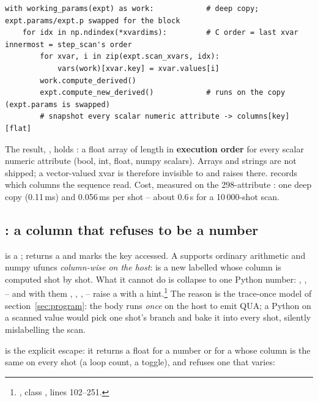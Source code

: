 \begin{lstlisting}[style=py]
with working_params(expt) as work:            # deep copy; expt.params/expt.p swapped for the block
    for idx in np.ndindex(*xvardims):         # C order = last xvar innermost = step_scan's order
        for xvar, i in zip(expt.scan_xvars, idx):
            vars(work)[xvar.key] = xvar.values[i]
        work.compute_derived()
        expt.compute_new_derived()            # runs on the copy (expt.params is swapped)
        # snapshot every scalar numeric attribute -> columns[key][flat]
\end{lstlisting}

The result, , holds : a float array of
length  in \textbf{execution order} for every scalar numeric
attribute (bool, int, float, numpy scalars). Arrays and strings are not
shipped; a vector-valued xvar is therefore invisible to  and
raises  there.  records which
columns the sequence read. Cost, measured on the 298-attribute
: one deep copy (0.11\,ms) and 0.056\,ms per shot -- about
0.6\,s for a 10\,000-shot scan.

\subsection{: a column that refuses to be a number}
\label{sec:xvars:paramref}

 is a ;  returns a
 and marks the key accessed. A
 supports ordinary arithmetic and numpy ufuncs \emph{column-wise
on the host}:  is a new 
labelled  whose column is computed shot by
shot. What it cannot do is collapse to one Python number:
, ,  -- and with them ,
, ,  -- raise a  with a
hint.\footnote{, class , lines
102--251.} The reason is the trace-once model of section~\ref{sec:program}:
the body runs \emph{once} on the host to emit QUA; a Python  on a
scanned value would pick one shot's branch and bake it into every shot,
silently mislabelling the scan.

 is the explicit escape: it returns a float for a number
or for a  whose column is the same on every shot (a loop
count, a toggle), and refuses one that varies:

